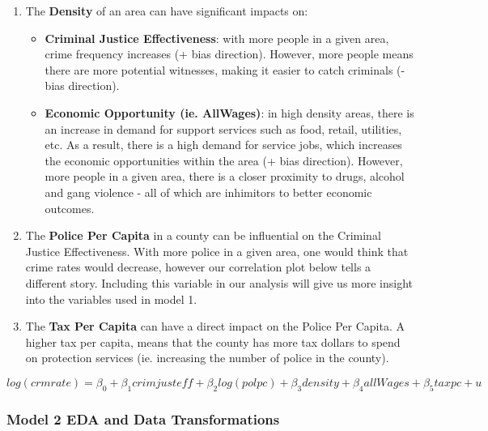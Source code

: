 \documentclass[]{article}
\providecommand{\tightlist}{%
  \setlength{\itemsep}{0pt}\setlength{\parskip}{0pt}}
\begin{document}
\begin{enumerate}
\def\labelenumi{\arabic{enumi}.}
\tightlist
\item
  The \textbf{Density} of an area can have significant impacts on:

  \begin{itemize}
  \tightlist
  \item
    \textbf{Criminal Justice Effectiveness}: with more people in a given
    area, crime frequency increases (+ bias direction). However, more
    people means there are more potential witnesses, making it easier to
    catch criminals (- bias direction).
  \item
    \textbf{Economic Opportunity (ie. AllWages)}: in high density areas,
    there is an increase in demand for support services such as food,
    retail, utilities, etc. As a result, there is a high demand for
    service jobs, which increases the economic opportunities within the
    area (+ bias direction). However, more people in a given area, there
    is a closer proximity to drugs, alcohol and gang violence - all of
    which are inhimitors to better economic outcomes.
  \end{itemize}
\item
  The \textbf{Police Per Capita} in a county can be influential on the
  Criminal Justice Effectiveness. With more police in a given area, one
  would think that crime rates would decrease, however our correlation
  plot below tells a different story. Including this variable in our
  analysis will give us more insight into the variables used in model 1.
\item
  The \textbf{Tax Per Capita} can have a direct impact on the Police Per
  Capita. A higher tax per capita, means that the county has more tax
  dollars to spend on protection services (ie. increasing the number of
  police in the county).
\end{enumerate}

\[log(crmrate) = \beta_0 + \beta_1crimjusteff + \beta_2log(polpc) + \beta_3density + \beta_4allWages + \beta_5taxpc + u\]

\hypertarget{model-2-eda-and-data-transformations}{%
\subsubsection{Model 2 EDA and Data
Transformations}\label{model-2-eda-and-data-transformations}}
\end{document}
